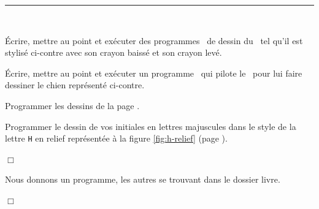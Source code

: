 \noindent \rule{137mm}{0.1mm} %
\begin{exercices}{\ \\

\vspace{-\baselineskip}
\noindent \begin{minipage}[t]{88mm}
\tiret Écrire, mettre au point et exécuter des programmes \python\ de dessin du
\robot\ tel qu'il est stylisé ci-contre avec son
crayon baissé et son crayon levé.
\end{minipage}
\hfill
\begin{minipage}[t]{44mm}
\vspace{2.0cm}
\hspace{-4.4cm}  %
\end{minipage}

\noindent \begin{minipage}[t]{103mm}
\tiret  Écrire, mettre au point et exécuter un programme \python\ qui
pilote le \robot\ pour lui faire dessiner le chien représenté
ci-contre.
\end{minipage}
\hfill
\begin{minipage}[t]{29mm}
\vspace{2.3cm}
\hspace{-2.9cm}  %
\end{minipage}

\noindent \begin{minipage}[t]{103mm}
\tiret  Programmer les dessins de la
pa\-ge \pageref{fig:quadrilateres}.
\end{minipage}

\vspace{1.5mm}

\tiret  Programmer le dessin de vos initiales en lettres majuscules
dans le style de la lettre {\tt H} en relief représentée à la
figure \ref{fig:h-relief} (page \pageref{fig:h-relief}).

\noindent $\Box$}\end{exercices}

\newpage
\begin{corrige}{Nous donnons un programme, les autres se trouvant dans le dossier {\idt livre}.

\noindent $\Box$}\end{corrige}

\vfill

